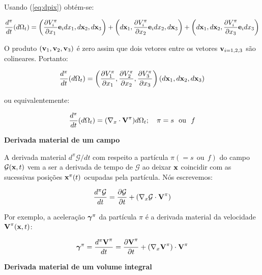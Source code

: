 \documentclass[
	11pt, %
	fleqn, %
	a4paper, %
]{LegrandOrangeBook}
\begin{document}
Usando (\ref{eq:dpix}) obtém-se:

\begin{equation}
	\label{eq:derivadavolumematerial2}	
	\dfrac{d^\pi}{dt}(d\Omega_t) = \left(\dfrac{\partial V_i^\pi}{\partial x_1}\textbf{e}_idx_1,d\textbf{x}_2,d\textbf{x}_3\right) + \left(d\textbf{x}_1,\dfrac{\partial V_i^\pi}{\partial x_2}\textbf{e}_idx_2,d\textbf{x}_3\right)+\left(d\textbf{x}_1,d\textbf{x}_2,\dfrac{\partial V_i^\pi}{\partial x_3}\textbf{e}_idx_3\right)
\end{equation}

O produto $(\textbf{v}_1,\textbf{v}_2,\textbf{v}_3)$ é zero assim que dois vetores entre os vetores $\textbf{v}_{i=1,2,3}$ são colineares. Portanto:

\begin{equation}
	\label{eq:derivadavolumematerial3}	
	\dfrac{d^\pi}{dt}(d\Omega_t) = \left(\dfrac{\partial V_1^\pi}{\partial x_1},\dfrac{\partial V_2^\pi}{\partial x_2},\dfrac{\partial V_3^\pi}{\partial x_3}\right)(d\textbf{x}_1,d\textbf{x}_2,d\textbf{x}_3)
\end{equation}

ou equivalentemente:

\begin{equation}
	\label{eq:derivadavolumematerial3}	
	\dfrac{d^\pi}{dt}(d\Omega_t) = (\nabla_x \cdot \textbf{V}^\pi)d\Omega_t; ~~~ \pi = s ~~\text{ou} ~~ f
\end{equation}

\textbf{Derivada material de um campo}

A derivada material $d^\pi \mathcal{G}/dt$ com respeito a partícula $\pi (=s~~\text{ou}~~f)$ do campo $\mathcal{G}(\textbf{x}, t)$ vem a ser a derivada de tempo de $\mathcal{G}$ ao deixar $\textbf{x}$ coincidir com as sucessivas posições $\textbf{x}^{\pi}(t)$ ocupadas pela partícula. Nós escrevemos:

\begin{equation}
	\label{eq:derivadavolumematerial4}	
	\frac{d^\pi \mathcal{G}}{dt} = \dfrac{\partial \mathcal{G}}{\partial t} + (\nabla_x \mathcal{G} \cdot \textbf{V}^{\pi})
\end{equation}

Por exemplo, a aceleração $\bm{\gamma}^{\pi}$ da partícula $\pi$ é a derivada material da velocidade $\textbf{V}^{\pi}(\textbf{x},t)$:

\begin{equation}
	\label{eq:derivadavolumematerial5}	
	\bm{\gamma}^{\pi} = \dfrac{d^\pi \textbf{V}^{\pi}}{dt} = \dfrac{\partial \textbf{V}^{\pi}}{\partial t}+(\nabla_x \textbf{V}^{\pi})\cdot \textbf{V}^\pi
\end{equation}

\textbf{Derivada material de um volume integral}
\end{document}
